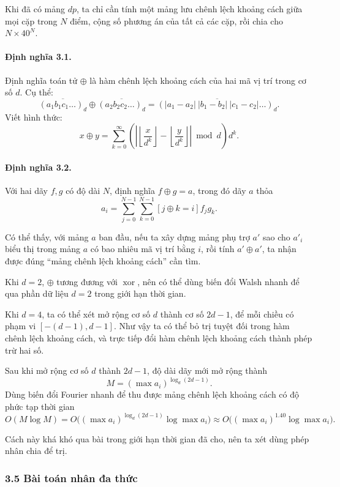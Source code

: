 \documentclass[11pt]{article}
\begin{document}
Khi đã có mảng \(dp\), ta chỉ cần tính một mảng lưu chênh lệch khoảng cách giữa
mọi cặp trong \(N\) điểm, cộng số phương án của tất cả các cặp, rồi chia cho
\(N\times 40^N\).

\paragraph{Định nghĩa 3.1.}
Định nghĩa toán tử \(\oplus\) là hàm chênh lệch khoảng cách của hai mã vị trí
trong cơ số \(d\). Cụ thể:
\[
  \overline{(a_1b_1c_1\ldots)_d}
  \oplus
  \overline{(a_2b_2c_2\ldots)_d}
  =
  \overline{(|a_1-a_2|\ |b_1-b_2|\ |c_1-c_2|\ldots)_d}.
\]
Viết hình thức:
\[
  x\oplus y=
  \sum_{k=0}^{\infty}
  \left(
    \left|
    \left\lfloor\frac{x}{d^k}\right\rfloor
    -
    \left\lfloor\frac{y}{d^k}\right\rfloor
    \right|
    \bmod d
  \right)d^k.
\]

\paragraph{Định nghĩa 3.2.}
Với hai dãy \(f,g\) có độ dài \(N\), định nghĩa \(f\oplus g=a\), trong đó dãy
\(a\) thỏa
\[
  a_i=\sum_{j=0}^{N-1}\sum_{k=0}^{N-1}[j\oplus k=i]f_jg_k.
\]

Có thể thấy, với mảng \(a\) ban đầu, nếu ta xây dựng mảng phụ trợ \(a'\) sao
cho \(a'_i\) biểu thị trong mảng \(a\) có bao nhiêu mã vị trí bằng \(i\), rồi
tính \(a'\oplus a'\), ta nhận được đúng ``mảng chênh lệch khoảng cách'' cần
tìm.

Khi \(d=2\), \(\oplus\) tương đương với \(\operatorname{xor}\), nên có thể dùng
biến đổi Walsh nhanh để qua phần dữ liệu \(d=2\) trong giới hạn thời gian.

Khi \(d=4\), ta có thể xét mở rộng cơ số \(d\) thành cơ số \(2d-1\), để mỗi
chiều có phạm vi \([-(d-1),d-1]\). Như vậy ta có thể bỏ trị tuyệt đối trong hàm
chênh lệch khoảng cách, và trực tiếp đổi hàm chênh lệch khoảng cách thành phép
trừ hai số.

Sau khi mở rộng cơ số \(d\) thành \(2d-1\), độ dài dãy mới mở rộng thành
\[
  M=(\max a_i)^{\log_d(2d-1)}.
\]
Dùng biến đổi Fourier nhanh để thu được mảng chênh lệch khoảng cách có độ phức
tạp thời gian
\[
  O(M\log M)
  =
  O\bigl((\max a_i)^{\log_d(2d-1)}\log \max a_i\bigr)
  \approx
  O\bigl((\max a_i)^{1.40}\log\max a_i\bigr).
\]

Cách này khá khó qua bài trong giới hạn thời gian đã cho, nên ta xét dùng phép
nhân chia để trị.

\subsubsection*{3.5 Bài toán nhân đa thức}
\end{document}
